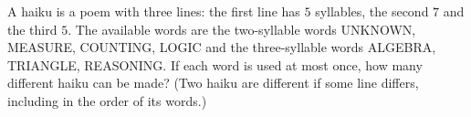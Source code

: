 A haiku is a poem with three lines: the first line has $5$ syllables, the second $7$ and the third $5$. The available words are the two-syllable words UNKNOWN, MEASURE, COUNTING, LOGIC and the three-syllable words ALGEBRA, TRIANGLE, REASONING. If each word is used at most once, how many different haiku can be made? (Two haiku are different if some line differs, including in the order of its words.)
